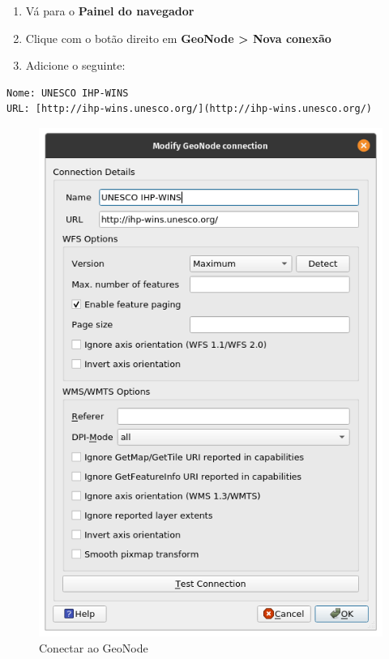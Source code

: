 \documentclass[
]{krantz}
\providecommand{\tightlist}{%
  \setlength{\itemsep}{0pt}\setlength{\parskip}{0pt}}
\begin{document}
\begin{enumerate}
\def\labelenumi{\arabic{enumi}.}
\tightlist
\item
  Vá para o \textbf{Painel do navegador}
\item
  Clique com o botão direito em \textbf{GeoNode \textgreater{} Nova conexão}
\item
  Adicione o seguinte:
\end{enumerate}

\begin{verbatim}
Nome: UNESCO IHP-WINS
URL: [http://ihp-wins.unesco.org/](http://ihp-wins.unesco.org/)
\end{verbatim}

\begin{figure}
\centering
\includegraphics{media/modulo2/connect-geonode.png}
\caption{Conectar ao GeoNode}
\end{figure}
\end{document}

